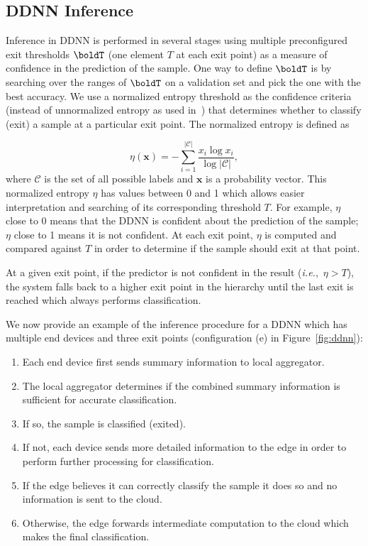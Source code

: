 \documentclass[10pt, conference, compsocconf]{IEEEtran}
\newcommand{\ie}{\emph{i.e.}}
\begin{document}
\subsection{DDNN Inference}

Inference in DDNN is performed in several stages using multiple preconfigured exit thresholds $\boldT$ (one element $T$ at each exit point) as a measure of confidence in the prediction of the sample. One way to define $\boldT$ is by searching over the ranges of $\boldT$ on a validation set and pick the one with the best accuracy. We use a normalized entropy threshold as the confidence criteria (instead of unnormalized entropy as used in~\cite{teerapittayanon2016branchynet}) that determines whether to classify (exit) a sample at a particular exit point. The normalized entropy is defined as

$$\eta (\mathbf{x}) =-\sum_{i=1}^{|\mathcal{C}|}{\frac {x_{i}\log x_{i}}{\log |\mathcal{C}|}},$$
where $\mathcal C$ is the set of all possible labels and $\textbf{x}$ is a probability vector. This normalized entropy $\eta$ has values between 0 and 1 which allows easier interpretation and searching of its corresponding threshold $T$. For example, $\eta$ close to 0 means that the DDNN is confident about the prediction of the sample; $\eta$ close to 1 means it is not confident. At each exit point, $\eta$ is computed and compared against $T$ in order to determine if the sample should exit at that point.

At a given exit point, if the predictor is not confident in the result (\ie,~$\eta > T$), the system falls back to a higher exit point in the hierarchy until the last exit is reached which always performs classification.

We now provide an example of the inference procedure for a DDNN which has multiple end devices and three exit points (configuration (e) in Figure~\ref{fig:ddnn}):
\begin{enumerate}
  \item Each end device first sends summary information to local aggregator.
  \item The local aggregator determines if the combined summary information is sufficient for accurate classification.
  \item If so, the sample is classified (exited). %
  \item If not, each device sends more detailed information to the edge in order to perform further processing for classification.
  \item If the edge believes it can correctly classify the sample it does so and no information is sent to the cloud.
  \item Otherwise, the edge forwards intermediate computation to the cloud which makes the final classification.
\end{enumerate}
\end{document}
